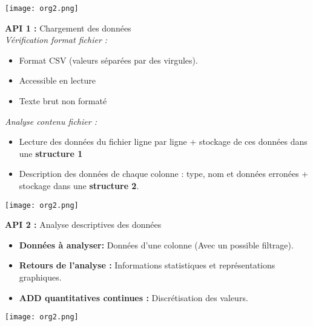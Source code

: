 	\begin{frame}
		\begin{center}\texttt{[image: org2.png]}\end{center}
	\end{frame}
	
	\begin{frame}
		\textbf{API 1 :} Chargement des données\\
		\textit{Vérification format fichier :}
		\begin{itemize}
			\item Format CSV (valeurs séparées par des virgules).
			\item Accessible en lecture
			\item Texte brut non formaté
		\end{itemize} \pause
		\vspace{1cm}
		\textit{Analyse contenu fichier :}
		\begin{itemize}
			\item Lecture des données du fichier ligne par ligne + stockage de ces données dans une \textbf{structure 1} 
			\item Description des données de chaque colonne : type, nom et données erronées + stockage dans une \textbf{structure 2}.
		\end{itemize}		 		
	\end{frame}
	
	\begin{frame}
		\begin{center}\texttt{[image: org2.png]}\end{center}
	\end{frame}
	
	\begin{frame}
		\textbf{API 2 :} Analyse descriptives des données\\
		\begin{itemize}
			\item \textbf{Données à analyser:} Données d'une colonne (Avec un possible filtrage).
			\item \textbf{Retours de l'analyse :} Informations statistiques et représentations graphiques.
			\item \textbf{ADD quantitatives continues :} Discrétisation des valeurs.
		\end{itemize}	
	\end{frame}
	
	\begin{frame}
		\begin{center}\texttt{[image: org2.png]}\end{center}
	\end{frame}
	
